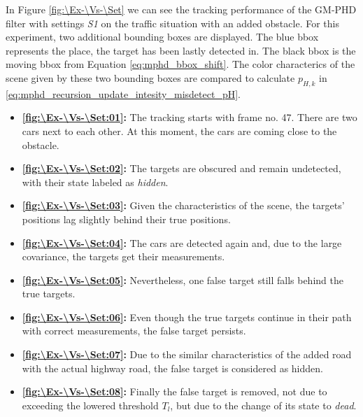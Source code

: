 In Figure \ref{fig:\Ex-\Vs-\Set} we can see the tracking performance of the GM-PHD filter with settings \textit{S1}
on the traffic situation with an added obstacle. For this experiment, two additional bounding boxes are displayed.
The blue bbox represents the place, the target has been lastly detected in. The black bbox is the moving bbox from Equation \eqref{eq:mphd_bbox_shift}. The color characterics of the scene given by these two bounding boxes are compared to calculate $p_{H,k}$ in \eqref{eq:mphd_recursion_update_intesity_misdetect_pH}.
\begin{itemize}
    \item \textbf{\ref{fig:\Ex-\Vs-\Set:01}:} The tracking starts with frame no. 47. There are two cars next to each
    other. At this moment, the cars are coming close to the obstacle.
    \item \textbf{\ref{fig:\Ex-\Vs-\Set:02}:} The targets are obscured and remain undetected, with their state labeled as \textit{hidden}.
    \item \textbf{\ref{fig:\Ex-\Vs-\Set:03}:} Given the characteristics of the scene, the targets' positions lag slightly behind their true positions.
    \item \textbf{\ref{fig:\Ex-\Vs-\Set:04}:} The cars are detected again and, due to the large covariance, the
    targets get their measurements.
    \item \textbf{\ref{fig:\Ex-\Vs-\Set:05}:} Nevertheless, one false target still falls behind the true targets.
    \item \textbf{\ref{fig:\Ex-\Vs-\Set:06}:} Even though the true targets continue in their path with correct measurements, the false target persists.
    \item \textbf{\ref{fig:\Ex-\Vs-\Set:07}:} Due to the similar characteristics of the added road with the actual highway road, the false target is considered as hidden.
    \item \textbf{\ref{fig:\Ex-\Vs-\Set:08}:} Finally the false target is removed, not due to exceeding the lowered threshold $T_l$, but due to the change of its state to \textit{dead}.
\end{itemize}

